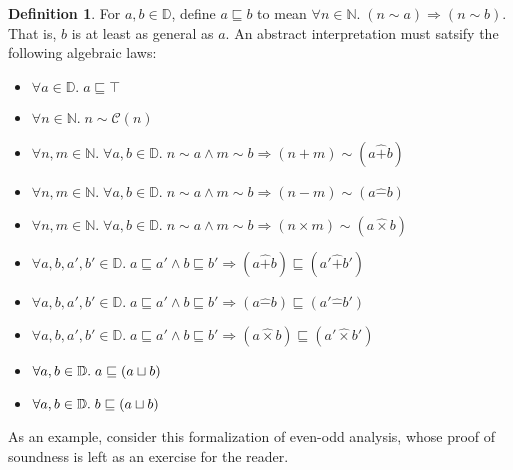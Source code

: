 \documentclass{amsbook}
\theoremstyle{definition}
\newtheorem{definition}[theorem]{Definition}
\theoremstyle{remark}
\numberwithin{section}{chapter}
\numberwithin{equation}{chapter}
\begin{document}
\begin{definition}
  For $a, b \in \mathbb D$, define $a \sqsubseteq b$ to mean $\forall n \in \mathbb N. \; (n \sim a) \Rightarrow (n \sim b)$.  That is, $b$ is at least as general as $a$.
  An abstract interpretation must satsify the following algebraic laws:
  \begin{itemize}
  \item $\forall a \in \mathbb D. \; a \sqsubseteq \top$
  \item $\forall n \in \mathbb N. \; n \sim \mathcal C(n)$
  \item $\forall n, m \in \mathbb N. \; \forall a, b \in \mathbb D. \; n \sim a \land m \sim b \Rightarrow (n + m) \sim (a \hat{+} b)$
  \item $\forall n, m \in \mathbb N. \; \forall a, b \in \mathbb D. \; n \sim a \land m \sim b \Rightarrow (n - m) \sim (a \hat{-} b)$
  \item $\forall n, m \in \mathbb N. \; \forall a, b \in \mathbb D. \; n \sim a \land m \sim b \Rightarrow (n \times m) \sim (a \hat{\times} b)$
  \item $\forall a, b, a', b' \in \mathbb D. \; a \sqsubseteq a' \land b \sqsubseteq b' \Rightarrow (a \hat{+} b) \sqsubseteq (a' \hat{+} b')$
  \item $\forall a, b, a', b' \in \mathbb D. \; a \sqsubseteq a' \land b \sqsubseteq b' \Rightarrow (a \hat{-} b) \sqsubseteq (a' \hat{-} b')$
  \item $\forall a, b, a', b' \in \mathbb D. \; a \sqsubseteq a' \land b \sqsubseteq b' \Rightarrow (a \hat{\times} b) \sqsubseteq (a' \hat{\times} b')$
  \item $\forall a, b \in \mathbb D. \; a \sqsubseteq (a \sqcup b)$
  \item $\forall a, b \in \mathbb D. \; b \sqsubseteq (a \sqcup b)$
  \end{itemize}
\end{definition}

As an example, consider this formalization of even-odd analysis, whose proof of soundness is left as an exercise for the reader.
\end{document}
